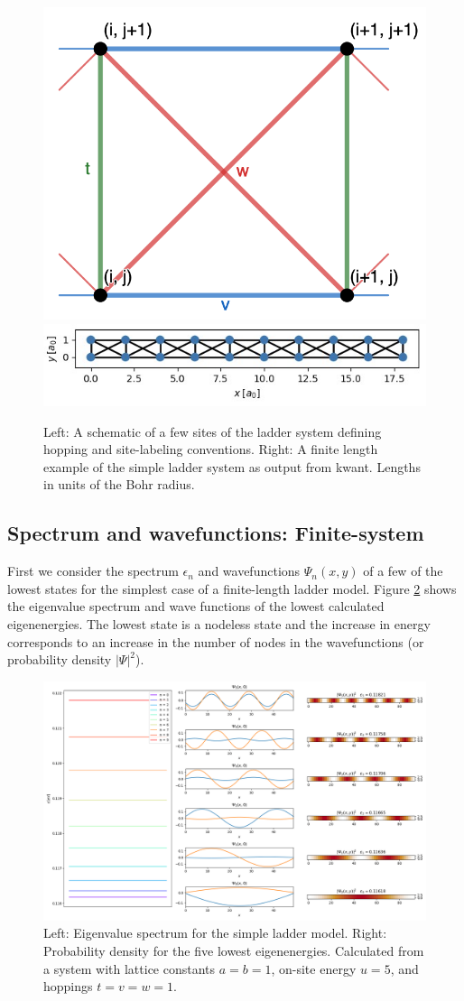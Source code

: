 \documentclass{article}
\begin{document}
\begin{figure}[ht]
    \centering
    \includegraphics[width = 0.25\linewidth]{./figures/hoppings-schematic.png}
    \includegraphics[width = 0.5\linewidth]{./figures/ladder_structure}
    \caption{Left: A schematic of a few sites of the ladder system defining hopping and site-labeling conventions. Right: A finite length example of the simple ladder system as output from kwant. Lengths in units of the Bohr radius.}
    \label{fig:simple-ladder}
\end{figure}

\subsection{Spectrum and wavefunctions: Finite-system}
First we consider the spectrum $\epsilon_n$ and wavefunctions $\Psi_n(x,y)$ of a few of the lowest states for the simplest case of a finite-length ladder model. Figure \ref{fig:simple-spec-wave} shows the eigenvalue spectrum and wave functions of the lowest calculated eigenenergies. The lowest state is a nodeless state and the increase in energy corresponds to an increase in the number of nodes in the wavefunctions (or probability density $|\Psi|^2$).

\begin{figure}
    \centering
    \includegraphics[width = \linewidth]{./figures/spec-wave_a1b1p0_u5t1v1w1.png}
    \caption{Left: Eigenvalue spectrum for the simple ladder model. Right: Probability density for the five lowest eigenenergies. Calculated from a system with lattice constants $a=b=1$, on-site energy $u=5$, and hoppings $t=v=w=1$.}
    \label{fig:simple-spec-wave}
\end{figure}
\end{document}
